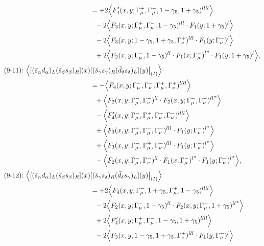 \begin{align}
&=
 + 2\Big\langle F_4'(x,y;\Gamma_\mu^+,\Gamma_\mu^-,1-\gamma_5,1+\gamma_5)^{llll}\Big\rangle
\notag\\*&\ \ 
-2\Big\langle F_3(x,y;\Gamma_\mu^+,\Gamma_\mu^-,1-\gamma_5)^{lll} \cdot F_1(y;1+\gamma_5)^l\Big\rangle
\notag\\*&\ \ 
-2\Big\langle F_3(x,y;1-\gamma_5,1+\gamma_5,\Gamma_\nu^+)^{lll} \cdot F_1(y;\Gamma_\nu^-)^l\Big\rangle
\notag\\*&\ \ 
 + 2\Big\langle F_2(x,y;\Gamma_\mu^-,1-\gamma_5)^{ll} \cdot {F_1(x;\Gamma_\mu^-)^l}^* \cdot F_1(y;1+\gamma_5)^l\Big\rangle,
\\
\mbox{(9-11):}\ 
\Big\langle
[(\bar s_\alpha d_\alpha)_L(\bar s_\beta s_\beta)_R](x)&
[(\bar s_\gamma s_\gamma)_R(\bar d_\delta s_\delta)_L](y)\big|_{(I)}
\Big\rangle
\notag\\*
&=
 - \Big\langle F_4(x,y;\Gamma_\mu^-,\Gamma_\nu^-,\Gamma_\mu^+,\Gamma_\nu^+)^{llll}\Big\rangle
\notag\\*&\ \ 
 + \Big\langle F_2(x,y;\Gamma_\mu^-,\Gamma_\nu^-)^{ll} \cdot {F_2(x,y;\Gamma_\mu^-,\Gamma_\nu^-)^{ll}}^*\Big\rangle
\notag\\*&\ \ 
 - \Big\langle F_4'(x,y;\Gamma_\mu^-,\Gamma_\mu^+,\Gamma_\nu^+,\Gamma_\nu^-)^{llll}\Big\rangle
\notag\\*&\ \ 
 + \Big\langle F_3(x,y;\Gamma_\mu^+,\Gamma_\mu^-,\Gamma_\nu^-)^{lll} \cdot {F_1(y;\Gamma_\nu^-)^l}^*\Big\rangle
\notag\\*&\ \ 
 + \Big\langle F_3(x,y;\Gamma_\mu^-,\Gamma_\mu^+,\Gamma_\nu^-)^{lll} \cdot {F_1(y;\Gamma_\nu^-)^l}^*\Big\rangle
\notag\\*&\ \ 
 - \Big\langle F_2(x,y;\Gamma_\mu^-,\Gamma_\nu^-)^{ll} \cdot {F_1(x;\Gamma_\mu^-)^l}^* \cdot {F_1(y;\Gamma_\nu^-)^l}^*\Big\rangle,
\\
\mbox{(9-12):}\ 
\Big\langle
[(\bar s_\alpha d_\alpha)_L(\bar s_\beta s_\beta)_R](x)&
[(\bar s_\gamma s_\delta)_R(\bar d_\delta s_\gamma)_L](y)\big|_{(I)}
\Big\rangle
\notag\\*
&=
 + 2\Big\langle F_4(x,y;\Gamma_\mu^-,1+\gamma_5,\Gamma_\mu^+,1-\gamma_5)^{llll}\Big\rangle
\notag\\*&\ \ 
-2\Big\langle F_2(x,y;\Gamma_\mu^-,1-\gamma_5)^{ll} \cdot {F_2(x,y;\Gamma_\mu^-,1+\gamma_5)^{ll}}^*\Big\rangle
\notag\\*&\ \ 
 + 2\Big\langle F_4'(x,y;\Gamma_\mu^+,\Gamma_\mu^-,1-\gamma_5,1+\gamma_5)^{llll}\Big\rangle
\notag\\*&\ \ 
-2\Big\langle F_3(x,y;1-\gamma_5,1+\gamma_5,\Gamma_\nu^+)^{lll} \cdot F_1(y;\Gamma_\nu^-)^l\Big\rangle

\end{align}
